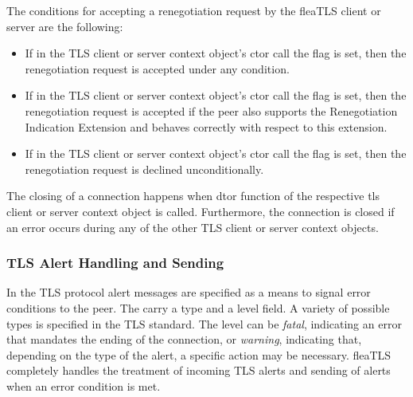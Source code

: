 \documentclass[a4paper,11pt]{scrartcl}
\begin{document}
  The conditions for accepting a renegotiation request by the  fleaTLS client or
  server are the following:
  \begin{itemize}
    \item If in the TLS client or server context object's ctor call the flag  is
      set, then the renegotiation request is accepted under any condition.
    \item If in the TLS client or server context object's ctor call the flag  is
      set, then the renegotiation request is accepted if the peer also supports
      the Renegotiation Indication Extension and behaves correctly with respect
      to this extension.
      \item If in the TLS client or server context object's ctor call the flag  is
      set, then the renegotiation request is declined unconditionally.
  \end{itemize}

  The closing of a connection happens when dtor function of the respective tls
  client or server context object is called. Furthermore, the connection is
  closed if an error occurs during any of the other TLS client or server context
  objects.

  \subsubsection{TLS Alert Handling and Sending }

  In the TLS protocol alert messages are specified as a means to signal error
  conditions to the peer. The carry a type and a level field. A variety of possible types
  is specified in the TLS standard. The level can be \emph{fatal}, indicating an error
  that mandates the ending of the connection, or \emph{warning}, indicating that,
  depending on the type of the alert, a specific action may be necessary.
  fleaTLS completely handles the treatment of incoming
  TLS alerts and sending of alerts when an error condition is met.
\end{document}
